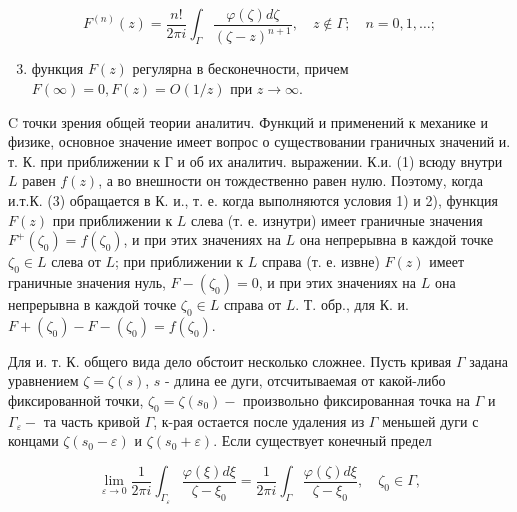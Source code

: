 \documentclass[10pt]{article}
\begin{document}
\[

F^{(n)}(z)=\frac{n !}{2 \pi i} \int_{\Gamma} \frac{\varphi(\zeta) d \zeta}{(\zeta-z)^{n+1}}, \quad z \notin \Gamma ; \quad n=0,1, \ldots ;

\]



\begin{enumerate}

  \setcounter{enumi}{2}

  \item функция $F(z)$ регулярна в бесконечности, причем $F(\infty)=0, F(z)=O(1 / z)$ при $z \rightarrow \infty$.

\end{enumerate}



$\mathrm{C}$ точки зрения общей теории аналитич. Функций и применений $к$ механике и физике, основное значение имеет вопрос о существовании граничных значений и. т. К. при приближении к Г и об их аналитич. выражении. К.и. (1) всюду внутри $L$ равен $f(z)$, а во внешности он тождественно равен нулю. Поэтому, когда и.т.К. (3) обращается в К. и., т. е. когда выполняются условия 1) и 2), функция $F(z)$ при приближении к $L$ слева (т. е. изнутри) имеет граничные значения $F^{+}\left(\zeta_{0}\right)=f\left(\zeta_{0}\right)$, и при этих значениях на $L$ она непрерывна в каждой точке $\zeta_{0} \in L$ слева от $L$; при приближении к $L$ справа (т. е. извне) $F(z)$ имеет граничные значения нуль, $F-\left(\zeta_{0}\right)=0$, и при этих значениях на $L$ она непрерывна в каждой точке $\zeta_{0} \in L$ справа от $L$. Т. обр., для К. и. $F+\left(\zeta_{0}\right)-F-\left(\zeta_{0}\right)=f\left(\zeta_{0}\right)$.



Для и. т. К. общего вида дело обстоит несколько сложнее. Пусть кривая $\Gamma$ задана уравнением $\zeta=\zeta(s)$, $s$ - длина ее дуги, отсчитываемая от какой-либо фиксированной точки, $\zeta_{0}=\zeta\left(s_{0}\right)-$ произвольно фиксированная точка на $\Gamma$ и $\Gamma_{\varepsilon}-$ та часть кривой $\Gamma$, к-рая остается после удаления из $\Gamma$ меньшей дуги с концами $\zeta\left(s_{0}-\varepsilon\right)$ и $\zeta\left(s_{0}+\varepsilon\right)$. Если существует конечный предел



\[

\lim _{\varepsilon \rightarrow 0} \frac{1}{2 \pi i} \int_{\Gamma_{\varepsilon}} \frac{\varphi(\xi) d \xi}{\zeta-\xi_{0}}=\frac{1}{2 \pi i} \int_{\Gamma} \frac{\varphi(\zeta) d \xi}{\zeta-\xi_{0}}, \quad \zeta_{0} \in \Gamma,

\]
\end{document}
